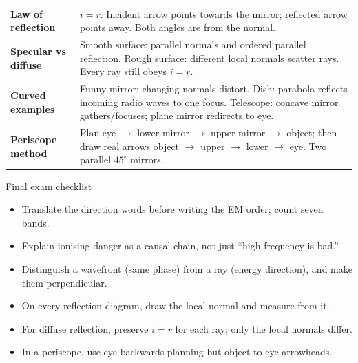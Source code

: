 \documentclass[11pt,a4paper]{article}
\begin{document}
\begin{tabularx}{\linewidth}{>{\bfseries}p{.22\linewidth}Y}
Law of reflection & $i=r$. Incident arrow points towards the mirror; reflected arrow points away. Both angles are from the normal.\\
Specular vs diffuse & Smooth surface: parallel normals and ordered parallel reflection. Rough surface: different local normals scatter rays. Every ray still obeys $i=r$.\\
Curved examples & Funny mirror: changing normals distort. Dish: parabola reflects incoming radio waves to one focus. Telescope: concave mirror gathers/focuses; plane mirror redirects to eye.\\
Periscope method & Plan eye $\rightarrow$ lower mirror $\rightarrow$ upper mirror $\rightarrow$ object; then draw real arrows object $\rightarrow$ upper $\rightarrow$ lower $\rightarrow$ eye. Two parallel $45^\circ$ mirrors.\\
\bottomrule
\end{tabularx}

\begin{keybox}{Final exam checklist}
\begin{itemize}
\item Translate the direction words before writing the EM order; count seven bands.
\item Explain ionising danger as a causal chain, not just ``high frequency is bad.''
\item Distinguish a wavefront (same phase) from a ray (energy direction), and make them perpendicular.
\item On every reflection diagram, draw the local normal and measure from it.
\item For diffuse reflection, preserve $i=r$ for each ray; only the local normals differ.
\item In a periscope, use eye-backwards planning but object-to-eye arrowheads.
\end{itemize}
\end{keybox}
\end{document}

